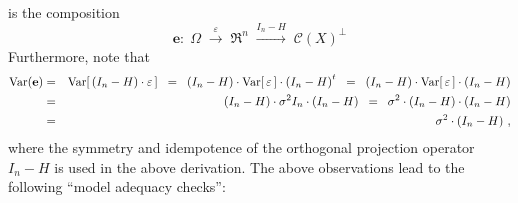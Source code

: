 \documentclass{article}
\begin{document}
is the composition
\begin{equation*}
\mathbf{e} :
\;\Omega
\;\overset{\varepsilon}{\longrightarrow} \; \Re^{n}
\;\overset{I_{n}-H}{\longrightarrow} \; \mathcal{C}(X)^{\perp}
\end{equation*}
Furthermore, note that
\begin{eqnarray*}
\textnormal{Var}\!\left(\mathbf{e}\right)
&=&\textnormal{Var}\!\left[\,\left(I_{n} - H\right)\cdot \varepsilon\,\right]
\;\;=\;\;\left(I_{n}-H\right)\cdot\textnormal{Var}\!\left[\,\varepsilon\,\right]\cdot \left(I_{n} - H\right)^{t}
\;\;=\;\;\left(I_{n}-H\right)\cdot\textnormal{Var}\!\left[\,\varepsilon\,\right]\cdot \left(I_{n} - H\right)\\
&=&\left(I_{n}-H\right)\cdot \sigma^{2}I_{n} \cdot \left(I_{n} - H\right)
\;\;=\;\;\sigma^{2}\cdot\left(I_{n}-H\right) \cdot \left(I_{n} - H\right) \\
&=&\sigma^{2}\cdot\left(I_{n}-H\right)\,,
\end{eqnarray*}
where the symmetry and idempotence of the orthogonal projection operator $I_{n} - H$ is used in the above
derivation.
The above observations lead to the following ``model adequacy checks'':
\end{document}
